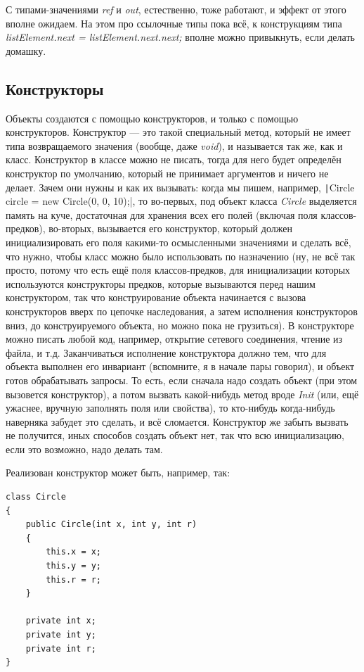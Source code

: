 \documentclass{../../text-style}
\begin{document}
С типами-значениями \textit{ref} и \textit{out}, естественно, тоже работают, и эффект от этого вполне ожидаем. На этом про ссылочные типы пока всё, к конструкциям типа \textit{listElement.next = listElement.next.next;} вполне можно привыкнуть, если делать домашку.

\subsection{Конструкторы}

Объекты создаются с помощью конструкторов, и только с помощью конструкторов. Конструктор --- это такой специальный метод, который не имеет типа возвращаемого значения (вообще, даже \textit{void}), и называется так же, как и класс. Конструктор в классе можно не писать, тогда для него будет определён конструктор по умолчанию, который не принимает аргументов и ничего не делает. Зачем они нужны и как их вызывать: когда мы пишем, например, \texttt|Circle circle = new Circle(0, 0, 10);|, то во-первых, под объект класса \textit{Circle} выделяется память на куче, достаточная для хранения всех его полей (включая поля классов-предков), во-вторых, вызывается его конструктор, который должен инициализировать его поля какими-то осмысленными значениями и сделать всё, что нужно, чтобы класс можно было использовать по назначению (ну, не всё так просто, потому что есть ещё поля классов-предков, для инициализации которых используются конструкторы предков, которые вызываются перед нашим конструктором, так что конструирование объекта начинается с вызова конструкторов вверх по цепочке наследования, а затем исполнения конструкторов вниз, до конструируемого объекта, но можно пока не грузиться). В конструкторе можно писать любой код, например, открытие сетевого соединения, чтение из файла, и т.д. Заканчиваться исполнение конструктора должно тем, что для объекта выполнен его инвариант (вспомните, я в начале пары говорил), и объект готов обрабатывать запросы. То есть, если сначала надо создать объект (при этом вызовется конструктор), а потом вызвать какой-нибудь метод вроде \textit{Init} (или, ещё ужаснее, вручную заполнять поля или свойства), то кто-нибудь когда-нибудь наверняка забудет это сделать, и всё сломается. Конструктор же забыть вызвать не получится, иных способов создать объект нет, так что всю инициализацию, если это возможно, надо делать там.

Реализован конструктор может быть, например, так:

\begin{verbatim}
class Circle
{
    public Circle(int x, int y, int r)
    {
        this.x = x;
        this.y = y;
        this.r = r;
    }

    private int x;
    private int y;
    private int r;
}
\end{verbatim}
\end{document}
